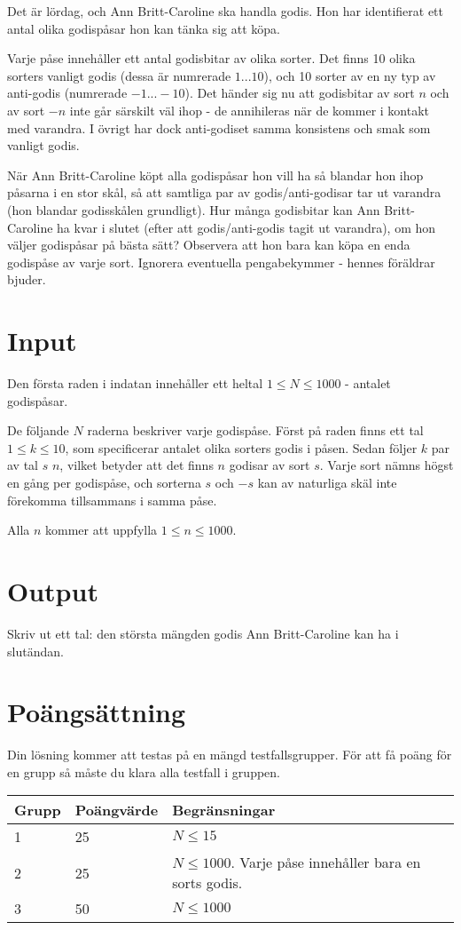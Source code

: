 
Det är lördag, och Ann Britt-Caroline ska handla godis. Hon har identifierat ett antal olika godispåsar hon kan tänka sig att köpa.

Varje påse innehåller ett antal godisbitar av olika sorter. Det finns 10 olika sorters vanligt godis (dessa är numrerade $1...10$), och 10 sorter av en ny typ av anti-godis (numrerade $-1...-10$). Det händer sig nu att godisbitar av sort $n$ och av sort $-n$ inte går särskilt väl ihop - de annihileras när de kommer i kontakt med varandra. I övrigt har dock anti-godiset samma konsistens och smak som vanligt godis.

När Ann Britt-Caroline köpt alla godispåsar hon vill ha så blandar hon ihop påsarna i en stor skål, så att samtliga par av godis/anti-godisar tar ut varandra (hon blandar godisskålen grundligt). Hur många godisbitar kan Ann Britt-Caroline ha kvar i slutet (efter att godis/anti-godis tagit ut varandra), om hon väljer godispåsar på bästa sätt? Observera att hon bara kan köpa en enda godispåse av varje sort. Ignorera eventuella pengabekymmer - hennes föräldrar bjuder.

\section*{Input}

Den första raden i indatan innehåller ett heltal $1 \le N \le 1000$ - antalet godispåsar.

De följande $N$ raderna beskriver varje godispåse.
Först på raden finns ett tal $1 \le k \le 10$, som specificerar antalet olika sorters godis i påsen.
Sedan följer $k$ par av tal $s$ $n$, vilket betyder att det finns $n$ godisar av sort $s$.
Varje sort nämns högst en gång per godispåse, och sorterna $s$ och $-s$ kan av naturliga skäl inte förekomma tillsammans i samma påse.

Alla $n$ kommer att uppfylla $1 \le n \le 1000$.

\section*{Output}

Skriv ut ett tal: den största mängden godis Ann Britt-Caroline kan ha i slutändan.


\section*{Poängsättning}
Din lösning kommer att testas på en mängd testfallsgrupper. För att få poäng för en grupp så måste du klara alla testfall i gruppen.

\begin{tabular}{| l | l | l |}
	\hline
	Grupp & Poängvärde & Begränsningar\\ \hline
  1     & 25         & $N \le 15$ \\ \hline
  2     & 25         & $N \le 1000$. Varje påse innehåller bara en sorts godis. \\ \hline
  3     & 50         & $N \le 1000$ \\ \hline
\end{tabular}
